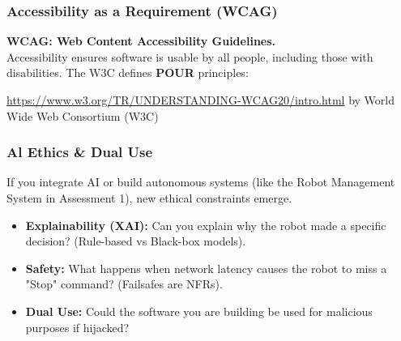 \documentclass[xcolor=table]{beamer}
\begin{document}
\begin{frame}[fragile]
    \frametitle{Accessibility as a Requirement (WCAG)}
    \textbf{WCAG: Web Content Accessibility Guidelines.}\\Accessibility ensures software is usable by all people, including those with disabilities. The W3C defines \textbf{POUR} principles:
    
    \vspace{0.3cm}
    \begin{center}
    \end{center}

    \tiny \url{https://www.w3.org/TR/UNDERSTANDING-WCAG20/intro.html} by World Wide Web Consortium (W3C)
\end{frame}

\begin{frame}
    \frametitle{Al Ethics \& Dual Use}
    If you integrate AI or build autonomous systems (like the Robot Management System in Assessment 1), new ethical constraints emerge.
    \begin{itemize}
        \item \textbf{Explainability (XAI):} Can you explain why the robot made a specific decision? (Rule-based vs Black-box models).
        \item \textbf{Safety:} What happens when network latency causes the robot to miss a "Stop" command? (Failsafes are NFRs).
        \item \textbf{Dual Use:} Could the software you are building be used for malicious purposes if hijacked?
    \end{itemize}
\end{frame}
\end{document}
